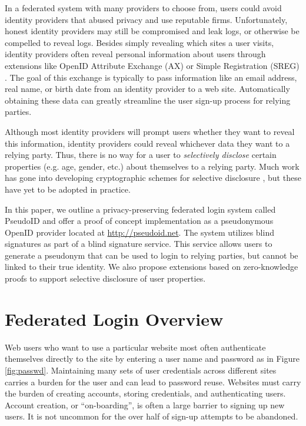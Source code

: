 \documentclass{llncs}
\begin{document}
In a federated system with many providers to choose from, users could
avoid identity providers that abused privacy and use reputable
firms. Unfortunately, honest identity providers may still be
compromised and leak logs, or otherwise be compelled to reveal
logs. Besides simply revealing which sites a user visits, identity
providers often reveal personal information about users through
extensions like OpenID Attribute Exchange (AX) \cite{AX} or Simple
Registration (SREG) \cite{Sreg}. The goal of this exchange is
typically to pass information like an email address, real name, or
birth date from an identity provider to a web site. Automatically
obtaining these data can greatly streamline the user sign-up process
for relying parties.

Although most identity providers will prompt users whether they want
to reveal this information, identity providers could reveal whichever
data they want to a relying party. Thus, there is no way for a user to
\emph{selectively disclose} certain properties (e.g. age, gender,
etc.) about themselves to a relying party. Much work has gone into
developing cryptographic schemes for selective disclosure
\cite{CaLy01,CaLy04,CHL05,CaGr08}, but these have yet to be adopted in
practice.

In this paper, we outline a privacy-preserving federated login system
called PseudoID and offer a proof of concept implementation as a
pseudonymous OpenID provider located at \url{http://pseudoid.net}. The
system utilizes blind signatures \cite{Cha82} as part of a blind
signature service. This service allows users to generate a pseudonym
that can be used to login to relying parties, but cannot be linked to
their true identity. We also propose extensions based on
zero-knowledge proofs \cite{GMR89} to support selective disclosure of
user properties.

\section{Federated Login Overview}
\label{sec:fedlogin}

Web users who want to use a particular website most often authenticate
themselves directly to the site by entering a user name and password as
in Figure \ref{fig:passwd}. Maintaining many sets of user credentials
across different sites carries a burden for the user and can lead to
password reuse. Websites must carry the burden of creating accounts,
storing credentials, and authenticating users. Account creation, or
``on-boarding'', is often a large barrier to signing up new users. It
is not uncommon for the over half of sign-up attempts to be abandoned.
\end{document}
